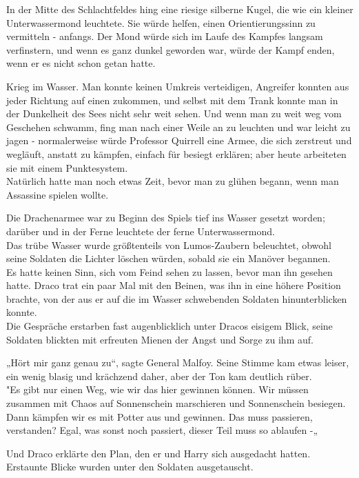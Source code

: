 {In der Mitte des Schlachtfeldes hing eine riesige silberne Kugel, die wie ein kleiner Unterwassermond leuchtete. Sie würde helfen, einen Orientierungssinn zu vermitteln - anfangs. Der Mond würde sich im Laufe des Kampfes langsam verfinstern, und wenn es ganz dunkel geworden war, würde der Kampf enden, wenn er es nicht schon getan hatte.

Krieg im Wasser. Man konnte keinen Umkreis verteidigen, Angreifer konnten aus jeder Richtung auf einen zukommen, und selbst mit dem Trank konnte man in der Dunkelheit des Sees nicht sehr weit sehen. Und wenn man zu weit weg vom Geschehen schwamm, fing man nach einer Weile an zu leuchten und war leicht zu jagen - normalerweise würde Professor Quirrell eine Armee, die sich zerstreut und wegläuft, anstatt zu kämpfen, einfach für besiegt erklären; aber heute arbeiteten sie mit einem Punktesystem.\\ Natürlich hatte man noch etwas Zeit, bevor man zu glühen begann, wenn man Assassine spielen wollte.

Die Drachenarmee war zu Beginn des Spiels tief ins Wasser gesetzt worden; darüber und in der Ferne leuchtete der ferne Unterwassermond.\\ Das trübe Wasser wurde größtenteils von Lumos-Zaubern beleuchtet, obwohl seine Soldaten die Lichter löschen würden, sobald sie ein Manöver begannen.\\ Es hatte keinen Sinn, sich vom Feind sehen zu lassen, bevor man ihn gesehen hatte. Draco trat ein paar Mal mit den Beinen, was ihn in eine höhere Position brachte, von der aus er auf die im Wasser schwebenden Soldaten hinunterblicken konnte.\\ Die Gespräche erstarben fast augenblicklich unter Dracos eisigem Blick, seine Soldaten blickten mit erfreuten Mienen der Angst und Sorge zu ihm auf.

„Hört mir ganz genau zu“, sagte General Malfoy. Seine Stimme kam etwas leiser, ein wenig blasig und krächzend daher, aber der Ton kam deutlich rüber.\\ "Es gibt nur einen Weg, wie wir das hier gewinnen können. Wir müssen zusammen mit Chaos auf Sonnenschein marschieren und Sonnenschein besiegen. Dann kämpfen wir es mit Potter aus und gewinnen. Das muss passieren, verstanden? Egal, was sonst noch passiert, dieser Teil muss so ablaufen -„

Und Draco erklärte den Plan, den er und Harry sich ausgedacht hatten.\\ Erstaunte Blicke wurden unter den Soldaten ausgetauscht.

}
